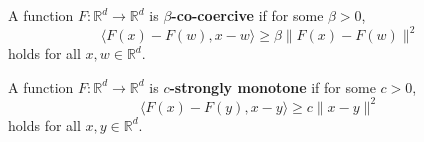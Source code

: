 	\begin{definition}
		\label{def:cocoercive}
		A function $F: \mathbb{R}^d \to \mathbb{R}^d$ is \textbf{$\beta$-co-coercive} if for some $\beta > 0$, 
		\begin{equation}
			\langle F(x) - F(w), x - w \rangle \geq \beta \|F(x) - F(w)\|^2
		\end{equation}
		holds for all $x, w \in \mathbb{R}^d$. 
	\end{definition}

	\begin{definition}
		\label{def:strongly_monotone}
		A function $F: \mathbb{R}^d \to \mathbb{R}^d$ is \textbf{$c$-strongly monotone} if for some $c > 0$, 
		\begin{equation}
			\langle F(x) - F(y), x - y \rangle \geq c \|x - y\|^2
		\end{equation}
		holds for all $x, y \in \mathbb{R}^d$. 
	\end{definition}


